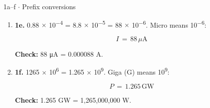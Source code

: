 \documentclass[11pt]{article}
\begin{document}
\begin{keepsection}
\begin{workedbox}{1a–f \ensuremath{\cdot} Prefix conversions}
\begin{enumerate}
\begin{equation*}{U}\, =\, 30\, \text{kV}\end{equation*}

\textbf{Check:} 30 kV = 30,000 V.
\item {}
\textbf{1e.} 0.88 \ensuremath{\times} 10\textsuperscript{\ensuremath{-}4} = 8.8 \ensuremath{\times} 10\textsuperscript{\ensuremath{-}5} = 88 \ensuremath{\times} 10\textsuperscript{\ensuremath{-}6}. Micro means 10\textsuperscript{\ensuremath{-}6}:

\begin{equation*}{I}\, =\, 88\, μ\mathrm{A}\end{equation*}

\textbf{Check:} 88 μA = 0.000088 A.
\item {}
\textbf{1f.} 1265 \ensuremath{\times} 10\textsuperscript{6} = 1.265 \ensuremath{\times} 10\textsuperscript{9}. Giga (G) means 10\textsuperscript{9}:

\begin{equation*}{P}\, =\, 1.265\, \text{GW}\end{equation*}

\textbf{Check:} 1.265 GW = 1,265,000,000 W.
\end{enumerate}
\end{workedbox}

\end{keepsection}
\end{document}
